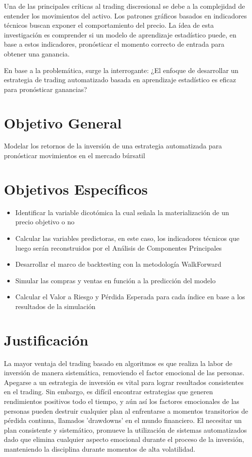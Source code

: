 \documentclass[a4paper,12pt]{Latex/Classes/PhDthesisPSnPDF}
\begin{document}
Una de las principales críticas al trading discresional se debe a la complejidad de entender los movimientos del activo. Los patrones gráficos basados en indicadores técnicos buscan exponer el comportamiento del precio. La ídea de esta investigación es comprender si un modelo de aprendizaje estadístico puede, en base a estos indicadores, pronósticar el momento correcto de entrada para obtener una ganancia.

En base a la problemática, surge la interrogante: ¿El enfoque de desarrollar un estrategia de trading automatizado basada en aprendizaje estadístico es eficaz para pronósticar ganancias?

\section{Objetivo General}

Modelar los retornos de la inversión de una estrategia automatizada para pronósticar movimientos en el mercado búrsatil

\section{Objetivos Específicos}

\begin{itemize}
\item Identificar la variable dicotómica la cual señala la materialización de un precio objetivo o no
\item Calcular las variables predictoras, en este caso, los indicadores técnicos que luego serán reconstruidos por el Análisis de Componentes Principales
\item Desarrollar el marco de backtesting con la metodología WalkForward
\item Simular las compras y ventas en función a la predicción del modelo 
\item Calcular el Valor a Riesgo y Pérdida Esperada para cada índice en base a los resultados de la simulación
\end{itemize}

\section{Justificación}

La mayor ventaja del trading basado en algoritmos es que realiza la labor de inversión de manera sistemática, removiendo el factor emocional de las personas. Apegarse a un estrategia de inversión es vital para lograr resultados consistentes en el trading. Sin embargo, es difícil encontrar estrategias que generen rendimientos positivos todo el tiempo, y aún así los factores emocionales de las personas pueden destruir cualquier plan al enfrentarse a momentos transitorios de pérdida continua, llamados 'drawdowns' en el mundo financiero. El necesitar un plan consistente y sistemático, promueve la utilización de sistemas automatizados dado que elimina cualquier aspecto emocional durante el proceso de la inversión, manteniendo la disciplina durante momentos de alta volatilidad.
\end{document}
